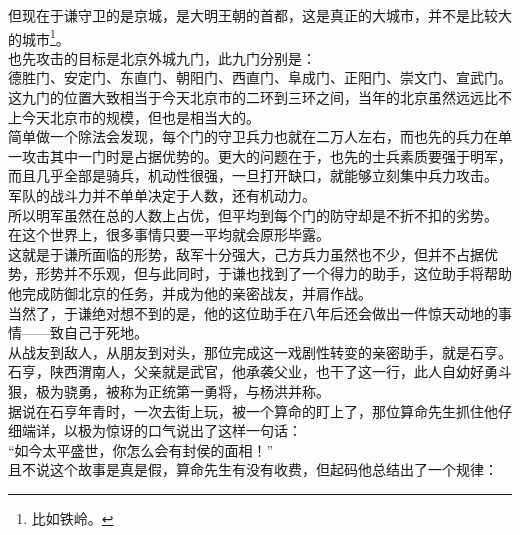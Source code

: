 \begin{multicols}{\theparacolNo}
但现在于谦守卫的是京城，是大明王朝的首都，这是真正的大城市，并不是比较大的城市\footnote{比如铁岭。}。\\

也先攻击的目标是北京外城九门，此九门分别是：\\

德胜门、安定门、东直门、朝阳门、西直门、阜成门、正阳门、崇文门、宣武门。\\

这九门的位置大致相当于今天北京市的二环到三环之间，当年的北京虽然远远比不上今天北京市的规模，但也是相当大的。\\

简单做一个除法会发现，每个门的守卫兵力也就在二万人左右，而也先的兵力在单一攻击其中一门时是占据优势的。更大的问题在于，也先的士兵素质要强于明军，而且几乎全部是骑兵，机动性很强，一旦打开缺口，就能够立刻集中兵力攻击。\\

军队的战斗力并不单单决定于人数，还有机动力。\\

所以明军虽然在总的人数上占优，但平均到每个门的防守却是不折不扣的劣势。\\

在这个世界上，很多事情只要一平均就会原形毕露。\\

这就是于谦所面临的形势，敌军十分强大，己方兵力虽然也不少，但并不占据优势，形势并不乐观，但与此同时，于谦也找到了一个得力的助手，这位助手将帮助他完成防御北京的任务，并成为他的亲密战友，并肩作战。\\

当然了，于谦绝对想不到的是，他的这位助手在八年后还会做出一件惊天动地的事情——致自己于死地。\\

从战友到敌人，从朋友到对头，那位完成这一戏剧性转变的亲密助手，就是石亨。\\

石亨，陕西渭南人，父亲就是武官，他承袭父业，也干了这一行，此人自幼好勇斗狠，极为骁勇，被称为正统第一勇将，与杨洪并称。\\

据说在石亨年青时，一次去街上玩，被一个算命的盯上了，那位算命先生抓住他仔细端详，以极为惊讶的口气说出了这样一句话：\\

“如今太平盛世，你怎么会有封侯的面相！”\\

且不说这个故事是真是假，算命先生有没有收费，但起码他总结出了一个规律：\\


\end{multicols}
